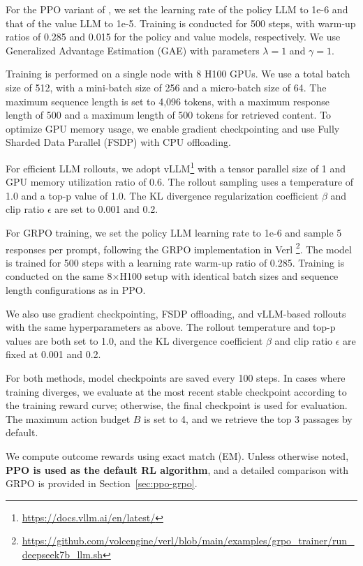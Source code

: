 For the PPO variant of \Ours, we set the learning rate of the policy LLM to 1e-6 and that of the value LLM to 1e-5. Training is conducted for 500 steps, with warm-up ratios of 0.285 and 0.015 for the policy and value models, respectively. We use Generalized Advantage Estimation (GAE) with parameters $\lambda = 1$ and $\gamma = 1$.

Training is performed on a single node with 8 H100 GPUs. We use a total batch size of 512, with a mini-batch size of 256 and a micro-batch size of 64. The maximum sequence length is set to 4,096 tokens, with a maximum response length of 500 and a maximum length of 500 tokens for retrieved content. To optimize GPU memory usage, we enable gradient checkpointing and use Fully Sharded Data Parallel (FSDP) with CPU offloading.

For efficient LLM rollouts, we adopt vLLM\footnote{\url{https://docs.vllm.ai/en/latest/}} with a tensor parallel size of 1 and GPU memory utilization ratio of 0.6. The rollout sampling uses a temperature of 1.0 and a top-p value of 1.0. The KL divergence regularization coefficient $\beta$ and clip ratio $\epsilon$ are set to 0.001 and 0.2.

For GRPO training, we set the policy LLM learning rate to 1e-6 and sample 5 responses per prompt, following the GRPO implementation in Verl \citep{sheng2024hybridflow}\footnote{\url{https://github.com/volcengine/verl/blob/main/examples/grpo_trainer/run_deepseek7b_llm.sh}}. The model is trained for 500 steps with a learning rate warm-up ratio of 0.285. Training is conducted on the same 8×H100 setup with identical batch sizes and sequence length configurations as in PPO.

We also use gradient checkpointing, FSDP offloading, and vLLM-based rollouts with the same hyperparameters as above. The rollout temperature and top-p values are both set to 1.0, and the KL divergence coefficient $\beta$ and clip ratio $\epsilon$ are fixed at 0.001 and 0.2.

For both methods, model checkpoints are saved every 100 steps. In cases where training diverges, we evaluate at the most recent stable checkpoint according to the training reward curve; otherwise, the final checkpoint is used for evaluation. The maximum action budget $B$ is set to 4, and we retrieve the top 3 passages by default.

We compute outcome rewards using exact match (EM). Unless otherwise noted, \textbf{PPO is used as the default RL algorithm}, and a detailed comparison with GRPO is provided in Section~\ref{sec:ppo-grpo}.

